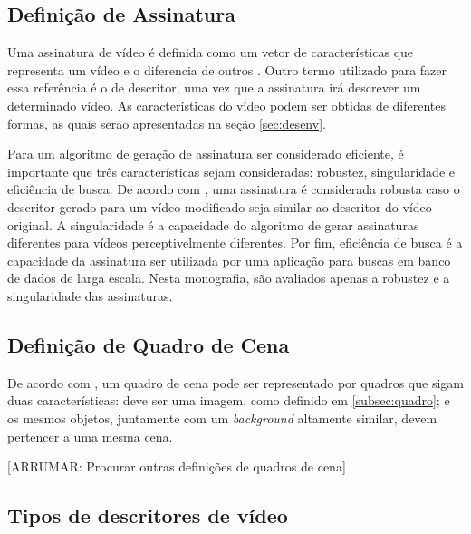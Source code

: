   	\subsection{Definição de Assinatura}
    \label{sec:signature}
    
    	Uma assinatura de vídeo é definida como um vetor de características que representa um vídeo e o diferencia de outros \citeauthor{lee2008robust}. Outro termo utilizado para fazer essa referência é o de descritor, uma vez que a assinatura irá descrever um determinado vídeo. As características do vídeo podem ser obtidas de diferentes formas, as quais serão apresentadas na seção \ref{sec:desenv}.
        
       Para um algoritmo de geração de assinatura ser considerado eficiente, é importante que três características sejam consideradas: robustez, singularidade e eficiência de busca. De acordo com \citeauthor{lee2008robust}, uma assinatura é considerada robusta caso o descritor gerado para um vídeo modificado seja similar ao descritor do vídeo original. A singularidade é a capacidade do algoritmo de gerar assinaturas diferentes para vídeos perceptivelmente diferentes. Por fim, eficiência de busca é a capacidade da assinatura  ser utilizada por uma aplicação para buscas em banco de dados de larga escala. Nesta monografia, são avaliados apenas a robustez e a singularidade das assinaturas.
       
       \subsection{Definição de Quadro de Cena}
       \label{sec:quadrocena}
       De acordo com \citeauthor{mao2015sceneframe}, um quadro de cena pode ser representado por quadros que sigam duas características: deve ser uma imagem, como definido em \ref{subsec:quadro}; e os mesmos objetos, juntamente com um \textit{background} altamente similar, devem pertencer a uma mesma cena.
       
       [ARRUMAR: Procurar outras definições de quadros de cena]
        
        \subsection{Tipos de descritores de vídeo}
        \label{sec:tiposdescritores}
        

